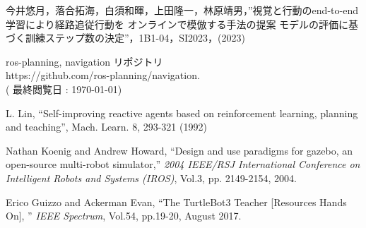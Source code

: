 \documentclass{jarticle}
\begin{document}
\begin{thebibliography}{99}
今井悠月，落合拓海，白須和暉，上田隆一，林原靖男，”視覚と行動のend-to-end 学習により経路追従行動を
オンラインで模倣する手法の提案 モデルの評価に基づく訓練ステップ数の決定”，1B1-04，SI2023，(2023)

ros-planning, navigation リポジトリ\\
https://github.com/ros-planning/navigation.\\
( 最終閲覧日 : \today )

L. Lin, “Self-improving reactive agents based on reinforcement learning, planning and teaching”, Mach. Learn. 8, 293-321 (1992)

Nathan Koenig and Andrew Howard, “Design and use paradigms for gazebo, an
open-source multi-robot simulator,” \textit{2004 IEEE/RSJ International Conference
on Intelligent Robots and Systems (IROS)}, Vol.3, pp.
2149-2154, 2004.

Erico Guizzo and Ackerman Evan, “The TurtleBot3 Teacher [Resources Hands On],
” \textit{IEEE Spectrum}, Vol.54, pp.19-20, August 2017.


\end{thebibliography}

\normalsize
\end{document}
